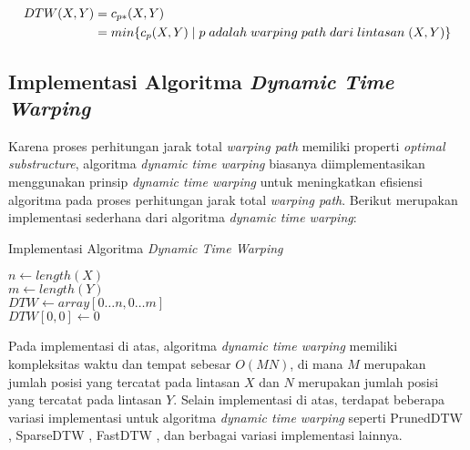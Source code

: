 \begin{align*}
    DTW(X, Y) & = c\textsubscript{$p*$}(X, Y) \\
    & = min\{c_p(X, Y)\;|\;p\;adalah\;warping\;path\;dari\;lintasan\;(X, Y)\}
\end{align*}

\subsection{Implementasi Algoritma \textit{Dynamic Time Warping}}

Karena proses perhitungan jarak total \textit{warping path} memiliki properti \textit{optimal substructure}, algoritma \textit{dynamic time warping} biasanya diimplementasikan menggunakan prinsip \textit{dynamic time warping} untuk meningkatkan efisiensi algoritma pada proses perhitungan jarak total \textit{warping path}. Berikut merupakan implementasi sederhana dari algoritma \textit{dynamic time warping}:

\begin{algorithm}
    \caption{Implementasi Algoritma \textit{Dynamic Time Warping}}
    \DontPrintSemicolon
  
    
    $n \gets length(X)$ \\
    $m \gets length(Y)$ \\
    $DTW \gets array [0 \dots n, 0 \dots m]$ \\
    $DTW[0, 0] \gets 0$ \\
    \label{bab2:dtw-pseudocode}
\end{algorithm}

Pada implementasi di atas, algoritma \textit{dynamic time warping} memiliki kompleksitas waktu dan tempat sebesar $O(MN)$, di mana $M$ merupakan jumlah posisi yang tercatat pada lintasan $X$ dan $N$ merupakan jumlah posisi yang tercatat pada lintasan $Y$. Selain implementasi di atas, terdapat beberapa variasi implementasi untuk algoritma \textit{dynamic time warping} seperti PrunedDTW \cite{diego:02:pruned-dtw}, SparseDTW \cite{ghazi:02:sparse-dtw}, FastDTW \cite{salvador:02:fast-dtw}, dan berbagai variasi implementasi lainnya.

